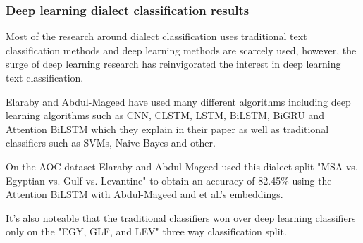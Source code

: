 \documentclass[12pt]{diazessay}
\begin{document}
        
        \subsubsection{Deep learning dialect classification results}
        Most of the research around dialect classification uses traditional text classification methods and deep learning methods are scarcely used, however, the surge of deep learning research has reinvigorated the interest in deep learning text classification.
        
        Elaraby and Abdul-Mageed have used many different algorithms including deep learning algorithms such as CNN, CLSTM, LSTM, BiLSTM, BiGRU and Attention BiLSTM which they explain in their paper\cite{elaraby-abdul-mageed-2018-deep} as well as traditional classifiers such as SVMs, Naive Bayes and other.
        
        On the AOC dataset Elaraby and Abdul-Mageed used this dialect split "MSA vs. Egyptian vs. Gulf vs. Levantine" to obtain an accuracy of 82.45\% using the Attention BiLSTM with Abdul-Mageed and et al.'s embeddings\cite{elaraby-abdul-mageed-2018-deep}.
        
        It's also noteable that the traditional classifiers won over deep learning classifiers only on the "EGY, GLF, and LEV" three way classification split\cite{elaraby-abdul-mageed-2018-deep}.
        

\end{document}
